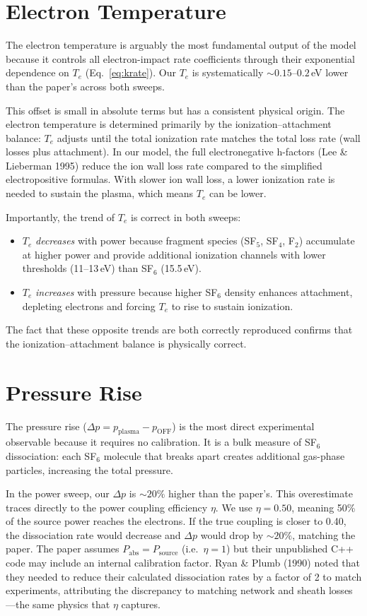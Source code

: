 \documentclass[11pt,a4paper]{article}
\begin{document}
\section{Electron Temperature}

The electron temperature is arguably the most fundamental output of the model because it controls all electron-impact rate coefficients through their exponential dependence on $T_e$ (Eq.~\ref{eq:krate}). Our $T_e$ is systematically ${\sim}0.15$--$0.2$\,eV lower than the paper's across both sweeps.

This offset is small in absolute terms but has a consistent physical origin. The electron temperature is determined primarily by the ionization--attachment balance: $T_e$ adjusts until the total ionization rate matches the total loss rate (wall losses plus attachment). In our model, the full electronegative h-factors (Lee \& Lieberman 1995) reduce the ion wall loss rate compared to the simplified electropositive formulas. With slower ion wall loss, a lower ionization rate is needed to sustain the plasma, which means $T_e$ can be lower.

Importantly, the trend of $T_e$ is correct in both sweeps:
\begin{itemize}[nosep]
\item $T_e$ \emph{decreases} with power because fragment species (SF$_5$, SF$_4$, F$_2$) accumulate at higher power and provide additional ionization channels with lower thresholds (11--13\,eV) than SF$_6$ (15.5\,eV).
\item $T_e$ \emph{increases} with pressure because higher SF$_6$ density enhances attachment, depleting electrons and forcing $T_e$ to rise to sustain ionization.
\end{itemize}
The fact that these opposite trends are both correctly reproduced confirms that the ionization--attachment balance is physically correct.

\section{Pressure Rise}

The pressure rise ($\Delta p = p_\text{plasma} - p_\text{OFF}$) is the most direct experimental observable because it requires no calibration. It is a bulk measure of SF$_6$ dissociation: each SF$_6$ molecule that breaks apart creates additional gas-phase particles, increasing the total pressure.

In the power sweep, our $\Delta p$ is ${\sim}20\%$ higher than the paper's. This overestimate traces directly to the power coupling efficiency $\eta$. We use $\eta = 0.50$, meaning 50\% of the source power reaches the electrons. If the true coupling is closer to 0.40, the dissociation rate would decrease and $\Delta p$ would drop by ${\sim}20\%$, matching the paper. The paper assumes $P_\text{abs} = P_\text{source}$ (i.e.\ $\eta = 1$) but their unpublished C++ code may include an internal calibration factor. Ryan \& Plumb (1990) noted that they needed to reduce their calculated dissociation rates by a factor of 2 to match experiments, attributing the discrepancy to matching network and sheath losses---the same physics that $\eta$ captures.
\end{document}
